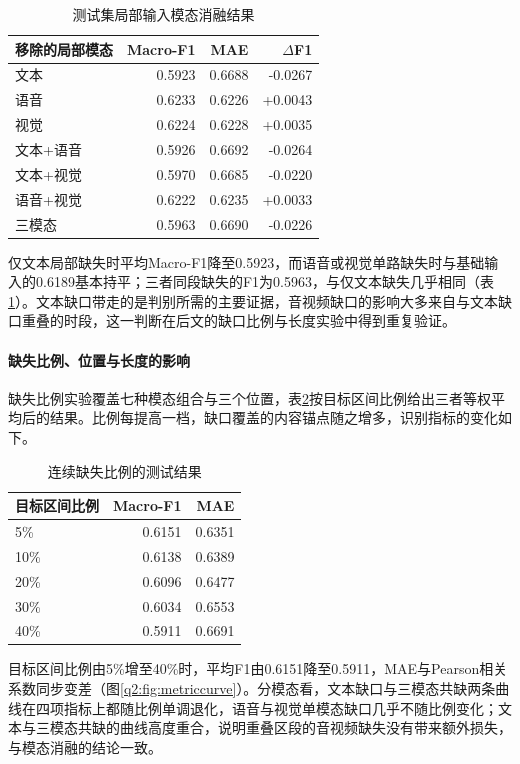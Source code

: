 \begin{table}[htbp]\centering\small
\caption{测试集局部输入模态消融结果}\label{q2:tab:local}
\begin{tabular}{lrrr}\toprule
移除的局部模态 & Macro-F1 & MAE & $\Delta$F1\\\midrule
文本 & 0.5923 & 0.6688 & -0.0267\\
语音 & 0.6233 & 0.6226 & +0.0043\\
视觉 & 0.6224 & 0.6228 & +0.0035\\
文本+语音 & 0.5926 & 0.6692 & -0.0264\\
文本+视觉 & 0.5970 & 0.6685 & -0.0220\\
语音+视觉 & 0.6222 & 0.6235 & +0.0033\\
三模态 & 0.5963 & 0.6690 & -0.0226\\
\bottomrule
\end{tabular}\end{table}


仅文本局部缺失时平均Macro-F1降至0.5923，而语音或视觉单路缺失时与基础输入的0.6189基本持平；三者同段缺失的F1为0.5963，与仅文本缺失几乎相同（表\ref{q2:tab:local}）。文本缺口带走的是判别所需的主要证据，音视频缺口的影响大多来自与文本缺口重叠的时段，这一判断在后文的缺口比例与长度实验中得到重复验证。

\paragraph{缺失比例、位置与长度的影响}

缺失比例实验覆盖七种模态组合与三个位置，表\ref{q2:tab:factors}按目标区间比例给出三者等权平均后的结果。比例每提高一档，缺口覆盖的内容锚点随之增多，识别指标的变化如下。

\begin{table}[htbp]\centering\small
\caption{连续缺失比例的测试结果}\label{q2:tab:factors}
\begin{tabular}{lrr}\toprule
目标区间比例 & Macro-F1 & MAE\\\midrule
5\% & 0.6151 & 0.6351\\
10\% & 0.6138 & 0.6389\\
20\% & 0.6096 & 0.6477\\
30\% & 0.6034 & 0.6553\\
40\% & 0.5911 & 0.6691\\
\bottomrule
\end{tabular}\end{table}


\begin{samepage}
目标区间比例由5\%增至40\%时，平均F1由0.6151降至0.5911，MAE与Pearson相关系数同步变差（图\ref{q2:fig:metriccurve}）。分模态看，文本缺口与三模态共缺两条曲线在四项指标上都随比例单调退化，语音与视觉单模态缺口几乎不随比例变化；文本与三模态共缺的曲线高度重合，说明重叠区段的音视频缺失没有带来额外损失，与模态消融的结论一致。\par\end{samepage}


